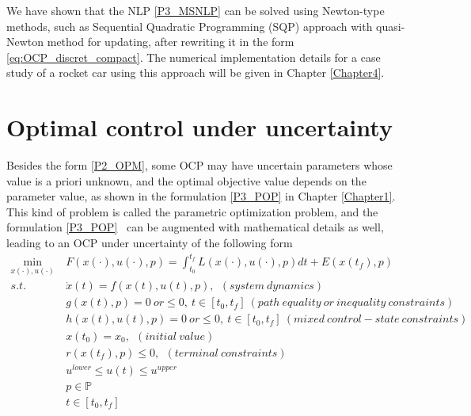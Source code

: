 \documentclass  [
  paper    = a4,
  BCOR     = 10mm,
  twoside,
  fontsize = 12pt,
  fleqn,
  toc      = bibnumbered,
  toc      = listofnumbered,
  numbers  = noendperiod,
  headings = normal,
  listof   = leveldown,
  version  = 3.03
]                                       {scrreprt}
\newcommand{\<}{\langle}
\renewcommand{\>}{\rangle}
\begin{document}
We have shown that the NLP \ref{P3_MSNLP} can be solved using Newton-type methods, such as Sequential Quadratic Programming (SQP) approach with quasi-Newton method for updating, after rewriting it in the form \ref{eq:OCP_discret_compact}. The numerical implementation details for a case study of a rocket car using this approach will be given in Chapter \ref{Chapter4}.

		

\chapter{Optimal control under uncertainty}
\label{Chapter3}
Besides the form \ref{P2_OPM}, some OCP may have uncertain parameters whose value is a priori unknown, and the optimal objective value depends on the parameter value, as shown in the formulation \ref{P3_POP} in Chapter \ref{Chapter1}. This kind of problem is called the parametric optimization problem, and the formulation \ref{P3_POP}  can be augmented with mathematical details as well, leading to an OCP under uncertainty of the following form
	\begin{subequations}
	\begin{align}
		\underset{x(\cdot), u(\cdot)}{\text{min}}   \ &  F(x(\cdot), u(\cdot), p)  = \int_{t_0}^{t_f}L(x(\cdot), u(\cdot), p)dt + E (x(t_f),p) \label{P4_cost} \\
		s.t.\ \ &  \dot{x} (t) = f(x(t), u(t), p), \ \ (system \ dynamics)   \label{P4_sd} \\
		& g(x(t), p) = 0 \  or \leq 0, \ t \in [t_0, t_f]\  (path\  equality\ or\ inequality\ constraints)   \label{P4_ec}\\
		&  h(x(t), u(t), p) =0\  or  \leq 0,\ t \in [t_0, t_f] \ (mixed \ control-state  \ constraints)   \label{P4_inc}\\
		& x(t_0) = x_0, \ \ (initial \ value) \\
		& r(x(t_f), p) \leq 0, \ \ (terminal \ constraints)  \label{P4_final} \\
		& u^{lower} \leq u(t) \leq u^{upper}   \label{P4_box_u} \\ 
		& p  \in   \mathbb{P}  \\
		& t \in [t_0, t_f] 
	\end{align}
	\label{P4_OCPPara}
\end{subequations}
\end{document}
